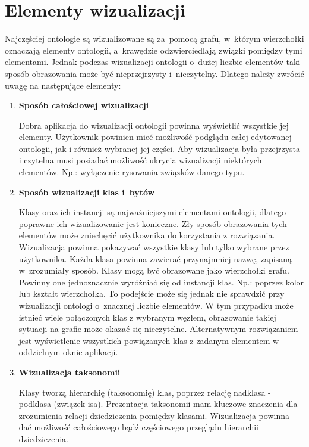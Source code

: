 \section{Elementy wizualizacji}
Najczęściej ontologie są wizualizowane są za~pomocą grafu, w~którym wierzchołki 
oznaczają elementy ontologii, a~krawędzie odzwierciedlają związki pomiędzy tymi elementami. Jednak podczas wizualizacji ontologii o~dużej liczbie 
elementów taki sposób obrazowania może być nieprzejrzysty i~nieczytelny. Dlatego należy zwrócić uwagę na następujące elementy:
\begin{enumerate}
\item{\bf Sposób całościowej wizualizacji}

\nopagebreak

Dobra aplikacja do wizualizacji ontologii powinna wyświetlić wszystkie jej elementy. Użytkownik powinien mieć możliwość podglądu całej edytowanej
ontologii, jak i również wybranej jej części. Aby wizualizacja była przejrzysta i czytelna musi posiadać możliwość ukrycia wizualizacji niektórych elementów. 
Np.: wyłączenie rysowania związków danego typu.
\item{\bf Sposób wizualizacji klas i~bytów}

\nopagebreak

Klasy oraz ich instancji są najważniejszymi elementami ontologii, dlatego poprawne ich wizualizowanie jest konieczne. Zły sposób obrazowania tych elementów 
może zniechęcić użytkownika do korzystania z rozwiązania. Wizualizacja powinna pokazywać wszystkie klasy lub tylko wybrane przez użytkownika. 
Każda klasa powinna zawierać przynajmniej nazwę, zapisaną w~zrozumiały sposób. Klasy mogą być obrazowane jako wierzchołki grafu. Powinny one jednoznacznie
 wyróżniać się od instancji klas. Np.: poprzez kolor lub kształt wierzchołka. To podejście może się jednak nie sprawdzić przy wizualizacji ontologi o~znacznej
liczbie elementów. W tym przypadku może istnieć wiele połączonych klas z wybranym węzłem, obrazowanie takiej sytuacji na grafie może okazać się nieczytelne. 
Alternatywnym rozwiązaniem jest wyświetlenie wszystkich powiązanych klas z zadanym elementem w oddzielnym oknie aplikacji.   

\item{\bf Wizualizacja taksonomii}

\nopagebreak

Klasy tworzą hierarchię (taksonomię) klas, poprzez relację nadklasa - podklasa (związek isa). Prezentacja taksonomii mam kluczowe znaczenia dla
 zrozumienia relacji dziedziczenia pomiędzy klasami. Wizualizacja powinna dać możliwość całościowego bądź częściowego przeglądu hierarchii dziedziczenia.


\end{enumerate}
